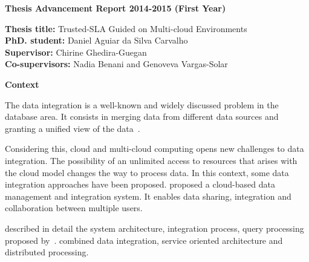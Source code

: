 \documentclass[12pt,a4paper,oneside]{report}
\author{Daniel Aguiar da Silva Carvalho}
\begin{document}
\sffamily
\begin{center}
\textbf{\large{Thesis Advancement Report 2014-2015 (First Year)}}
\end{center}

\begin{flushleft}
\textbf{Thesis title:} Trusted-SLA Guided on Multi-cloud Environments \\
\textbf{PhD. student:} Daniel Aguiar da Silva Carvalho \\
\textbf{Supervisor:} Chirine Ghedira-Guegan \\ 
\textbf{Co-supervisors:} Nadia Benani and Genoveva Vargas-Solar
\end{flushleft}


\begin{flushleft}
\textbf{Context}\\
\end{flushleft} 

The data integration is a well-known and widely discussed problem in the database area. It consists in merging data from different data sources and granting a unified view of the data~\cite{Lenzerini:2002}. 

Considering this, cloud and multi-cloud computing opens new challenges to data integration. 
The possibility of an unlimited access to resources that arises with the cloud model changes the way to process data.
In this context, some data integration approaches have been proposed.
\cite{Gonzalez:2010b} proposed a cloud-based data management and integration system.
It enables data sharing, integration and collaboration between multiple users. 


\cite{Gonzalez:2010} described in detail the system architecture, integration process, query processing proposed by~\cite{Gonzalez:2010b}. 
\cite{078} combined data integration, service oriented architecture and distributed processing. 
%
\end{document}
